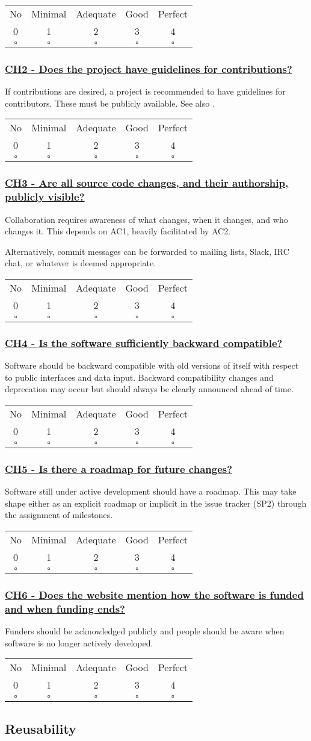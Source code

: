 \documentclass[a4paper,11pt]{article}
\newcommand{\criterion}[2]{\subsubsection*{\underline{#1 - #2}}\label{id:#1}}
\newcommand\CheckTable{%
  \begin{tabular}{ccccc}
    No & Minimal & Adequate & Good & Perfect \\
    0 & 1 & 2 & 3 & 4 \\
    \hline
    $\square$ & $\square$ & $\square$ & $\square$ & $\square$ \\
  \end{tabular}%
}
\newcommand{\refcrit}[1]{%
 \framebox[1.1\width]{\hyperref[id:#1]{#1}}
}
\begin{document}
\CheckTable

\newcommand{\chTwoID}{CH2}
\newcommand{\chTwoText}{Does the project have guidelines for contributions?}
\criterion{\chTwoID}{\chTwoText}

If contributions are desired, a project is recommended to have guidelines for
contributors. These must be publicly available.
See also \refcrit{AN8}.

\CheckTable

\newcommand{\chThreeID}{CH3}
\newcommand{\chThreeText}{Are all source code changes, and their authorship, publicly visible?}
\criterion{\chThreeID}{\chThreeText}

Collaboration requires awareness of what changes, when it changes, and who
changes it. This depends on AC1, heavily facilitated by AC2.

Alternatively, commit messages can be forwarded to mailing lists, Slack, IRC chat, or
whatever is deemed appropriate.

\CheckTable

\newcommand{\chFourID}{CH4}
\newcommand{\chFourText}{Is the software sufficiently backward compatible?}
\criterion{\chFourID}{\chFourText}

Software should be backward compatible with old versions of itself with respect
to public interfaces and data input. Backward compatibility changes and
deprecation may occur but should always be clearly announced ahead of time.

\CheckTable

\newcommand{\chFiveID}{CH5}
\newcommand{\chFiveText}{Is there a roadmap for future changes?}
\criterion{\chFiveID}{\chFiveText}

Software still under active development should have a roadmap. This may take
shape either as an explicit roadmap or implicit in the issue tracker
(SP2) through the assignment of milestones.

\CheckTable

\newcommand{\chSixID}{CH6}
\newcommand{\chSixText}{Does the website mention how the software is funded and when funding ends?}
\criterion{\chSixID}{\chSixText}

Funders should be acknowledged publicly and people should be aware when
software is no longer actively developed.

\CheckTable

\subsection{Reusability}\label{sec:reu}
\end{document}
